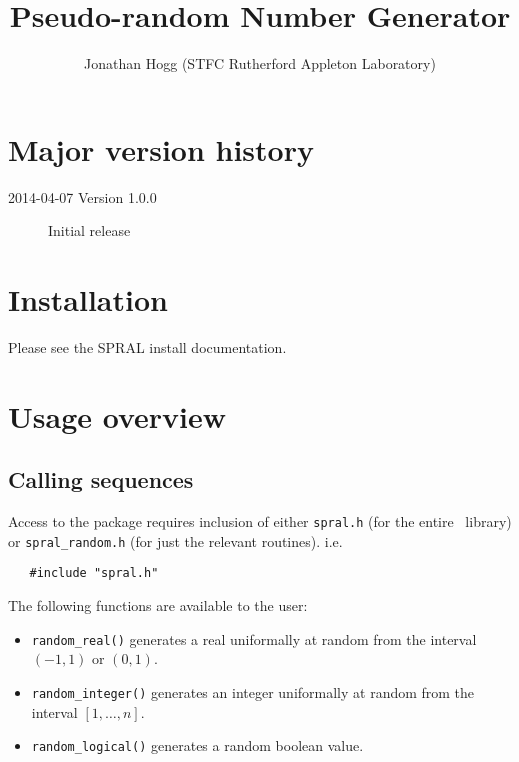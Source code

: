 
\title{Pseudo-random Number Generator}
\author{
   Jonathan Hogg (STFC Rutherford Appleton Laboratory) \\
}
\spralmaketitle
\thispagestyle{firststyle}

\section*{Major version history}
\begin{description}
\item[2014-04-07 Version 1.0.0] Initial release
\end{description}


\section{Installation}
Please see the SPRAL install documentation.


\section{Usage overview}

\subsection{Calling sequences}

Access to the package requires inclusion of either \texttt{spral.h} (for the
entire \spral\ library) or \texttt{spral\_random.h} (for just the relevant routines). i.e.

\begin{verbatim}
   #include "spral.h"
\end{verbatim}

\noindent
The following functions are available to the user:
\begin{itemize}
\item {\tt random\_real()} generates a real uniformally at random from the interval $(-1,1)$ or $(0,1)$.
\item {\tt random\_integer()} generates an integer uniformally at random from the interval $[1,\ldots,n]$.
\item {\tt random\_logical()} generates a random boolean value.
\end{itemize}

